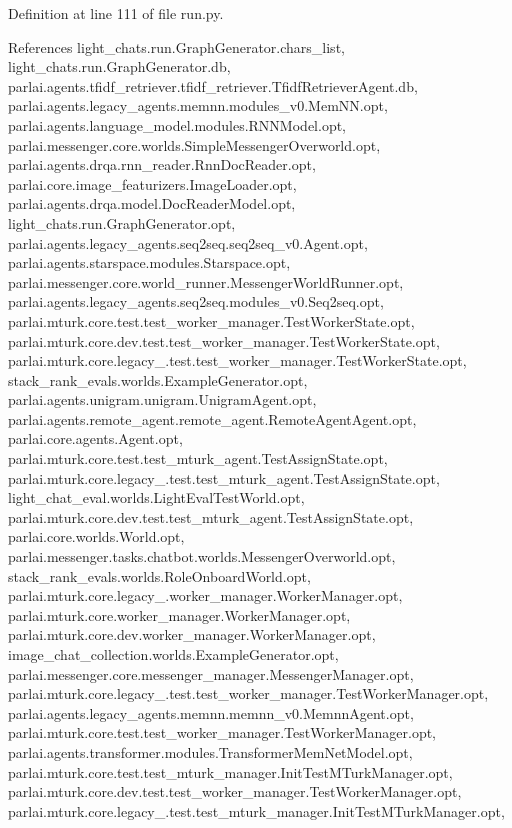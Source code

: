 Definition at line 111 of file run.\+py.



References light\+\_\+chats.\+run.\+Graph\+Generator.\+chars\+\_\+list, light\+\_\+chats.\+run.\+Graph\+Generator.\+db, parlai.\+agents.\+tfidf\+\_\+retriever.\+tfidf\+\_\+retriever.\+Tfidf\+Retriever\+Agent.\+db, parlai.\+agents.\+legacy\+\_\+agents.\+memnn.\+modules\+\_\+v0.\+Mem\+N\+N.\+opt, parlai.\+agents.\+language\+\_\+model.\+modules.\+R\+N\+N\+Model.\+opt, parlai.\+messenger.\+core.\+worlds.\+Simple\+Messenger\+Overworld.\+opt, parlai.\+agents.\+drqa.\+rnn\+\_\+reader.\+Rnn\+Doc\+Reader.\+opt, parlai.\+core.\+image\+\_\+featurizers.\+Image\+Loader.\+opt, parlai.\+agents.\+drqa.\+model.\+Doc\+Reader\+Model.\+opt, light\+\_\+chats.\+run.\+Graph\+Generator.\+opt, parlai.\+agents.\+legacy\+\_\+agents.\+seq2seq.\+seq2seq\+\_\+v0.\+Agent.\+opt, parlai.\+agents.\+starspace.\+modules.\+Starspace.\+opt, parlai.\+messenger.\+core.\+world\+\_\+runner.\+Messenger\+World\+Runner.\+opt, parlai.\+agents.\+legacy\+\_\+agents.\+seq2seq.\+modules\+\_\+v0.\+Seq2seq.\+opt, parlai.\+mturk.\+core.\+test.\+test\+\_\+worker\+\_\+manager.\+Test\+Worker\+State.\+opt, parlai.\+mturk.\+core.\+dev.\+test.\+test\+\_\+worker\+\_\+manager.\+Test\+Worker\+State.\+opt, parlai.\+mturk.\+core.\+legacy\+\_.\+test.\+test\+\_\+worker\+\_\+manager.\+Test\+Worker\+State.\+opt, stack\+\_\+rank\+\_\+evals.\+worlds.\+Example\+Generator.\+opt, parlai.\+agents.\+unigram.\+unigram.\+Unigram\+Agent.\+opt, parlai.\+agents.\+remote\+\_\+agent.\+remote\+\_\+agent.\+Remote\+Agent\+Agent.\+opt, parlai.\+core.\+agents.\+Agent.\+opt, parlai.\+mturk.\+core.\+test.\+test\+\_\+mturk\+\_\+agent.\+Test\+Assign\+State.\+opt, parlai.\+mturk.\+core.\+legacy\+\_.\+test.\+test\+\_\+mturk\+\_\+agent.\+Test\+Assign\+State.\+opt, light\+\_\+chat\+\_\+eval.\+worlds.\+Light\+Eval\+Test\+World.\+opt, parlai.\+mturk.\+core.\+dev.\+test.\+test\+\_\+mturk\+\_\+agent.\+Test\+Assign\+State.\+opt, parlai.\+core.\+worlds.\+World.\+opt, parlai.\+messenger.\+tasks.\+chatbot.\+worlds.\+Messenger\+Overworld.\+opt, stack\+\_\+rank\+\_\+evals.\+worlds.\+Role\+Onboard\+World.\+opt, parlai.\+mturk.\+core.\+legacy\+\_.\+worker\+\_\+manager.\+Worker\+Manager.\+opt, parlai.\+mturk.\+core.\+worker\+\_\+manager.\+Worker\+Manager.\+opt, parlai.\+mturk.\+core.\+dev.\+worker\+\_\+manager.\+Worker\+Manager.\+opt, image\+\_\+chat\+\_\+collection.\+worlds.\+Example\+Generator.\+opt, parlai.\+messenger.\+core.\+messenger\+\_\+manager.\+Messenger\+Manager.\+opt, parlai.\+mturk.\+core.\+legacy\+\_.\+test.\+test\+\_\+worker\+\_\+manager.\+Test\+Worker\+Manager.\+opt, parlai.\+agents.\+legacy\+\_\+agents.\+memnn.\+memnn\+\_\+v0.\+Memnn\+Agent.\+opt, parlai.\+mturk.\+core.\+test.\+test\+\_\+worker\+\_\+manager.\+Test\+Worker\+Manager.\+opt, parlai.\+agents.\+transformer.\+modules.\+Transformer\+Mem\+Net\+Model.\+opt, parlai.\+mturk.\+core.\+test.\+test\+\_\+mturk\+\_\+manager.\+Init\+Test\+M\+Turk\+Manager.\+opt, parlai.\+mturk.\+core.\+dev.\+test.\+test\+\_\+worker\+\_\+manager.\+Test\+Worker\+Manager.\+opt, parlai.\+mturk.\+core.\+legacy\+\_.\+test.\+test\+\_\+mturk\+\_\+manager.\+Init\+Test\+M\+Turk\+Manager.\+opt, 